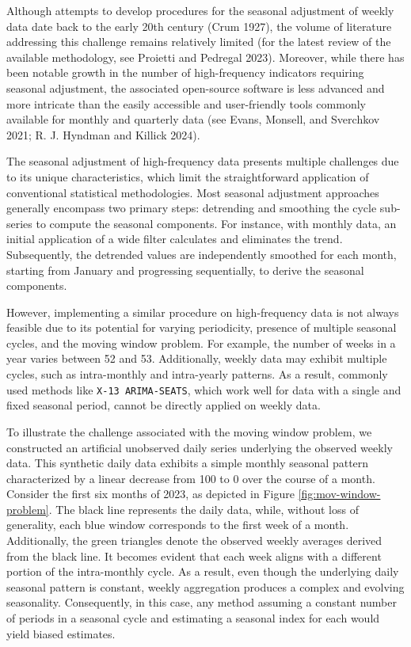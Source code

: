 Although attempts to develop procedures for the seasonal adjustment of weekly data date back to the early 20th century (Crum 1927), the volume of literature addressing this challenge remains relatively limited (for the latest review of the available methodology, see Proietti and Pedregal 2023). Moreover, while there has been notable growth in the number of high-frequency indicators requiring seasonal adjustment, the associated open-source software is less advanced and more intricate than the easily accessible and user-friendly tools commonly available for monthly and quarterly data (see Evans, Monsell, and Sverchkov 2021; R. J. Hyndman and Killick 2024).

The seasonal adjustment of high-frequency data presents multiple challenges due to its unique characteristics, which limit the straightforward application of conventional statistical methodologies. Most seasonal adjustment approaches generally encompass two primary steps: detrending and smoothing the cycle sub-series to compute the seasonal components. For instance, with monthly data, an initial application of a wide filter calculates and eliminates the trend. Subsequently, the detrended values are independently smoothed for each month, starting from January and progressing sequentially, to derive the seasonal components.

However, implementing a similar procedure on high-frequency data is not always feasible due to its potential for varying periodicity, presence of multiple seasonal cycles, and the moving window problem. For example, the number of weeks in a year varies between 52 and 53. Additionally, weekly data may exhibit multiple cycles, such as intra-monthly and intra-yearly patterns. As a result, commonly used methods like \texttt{X-13\ ARIMA-SEATS}, which work well for data with a single and fixed seasonal period, cannot be directly applied on weekly data.

To illustrate the challenge associated with the moving window problem, we constructed an artificial unobserved daily series underlying the observed weekly data. This synthetic daily data exhibits a simple monthly seasonal pattern characterized by a linear decrease from 100 to 0 over the course of a month. Consider the first six months of 2023, as depicted in Figure \ref{fig:mov-window-problem}. The black line represents the daily data, while, without loss of generality, each blue window corresponds to the first week of a month. Additionally, the green triangles denote the observed weekly averages derived from the black line. It becomes evident that each week aligns with a different portion of the intra-monthly cycle. As a result, even though the underlying daily seasonal pattern is constant, weekly aggregation produces a complex and evolving seasonality. Consequently, in this case, any method assuming a constant number of periods in a seasonal cycle and estimating a seasonal index for each would yield biased estimates.

